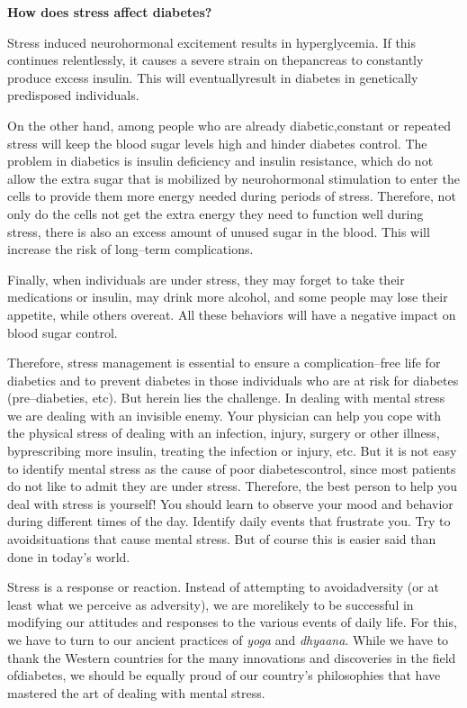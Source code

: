 \noindent\textbf{How does stress affect diabetes?}

Stress induced neurohormonal excitement results in hypergly\-ce\-mia. If this continues relentlessly, it causes a severe strain on the\break pancreas to constantly produce excess insulin. This will eventually\break result in diabetes in genetically predisposed individuals.

On the other hand, among people who are already diabetic,\break constant or repeated stress will keep the blood sugar levels high and hinder diabetes control. The problem in diabetics is insulin deficiency and insulin resistance, which do not allow the extra sugar that is mobilized by neurohormonal stimulation to enter the cells to provide them more energy needed during periods of stress. Therefore, not only do the cells not get the extra energy they need to function well during stress, there is also an excess amount of unused sugar in the blood. This will increase the risk of long–term complications.

Finally, when individuals are under stress, they may forget to take their medications or insulin, may drink more alcohol, and some people may lose their appetite, while others overeat. All these behaviors will have a negative impact on blood sugar control.

Therefore, stress management is essential to ensure a complica\-tion–free life for diabetics and to prevent diabetes in those indivi\-duals who are at risk for diabetes (pre–diabeties, etc). But herein lies the challenge. In dealing with mental stress we are dealing with an invisible enemy. Your physician can help you cope with the physical stress of dealing with an infection, injury, surgery or other illness, by\break prescribing more insulin, treating the infection or injury, etc. But it is not easy to identify mental stress as the cause of poor diabetes\break control, since most patients do not like to admit they are under stress. Therefore, the best person to help you deal with stress is yourself! You should learn to observe your mood and behavior during different times of the day. Identify daily events that frustrate you. Try to avoid\break situations that cause mental stress. But of course this is easier said than done in today’s world.

Stress is a response or reaction. Instead of attempting to avoid\break adversity (or at least what we perceive as adversity), we are more\break likely to be successful in modifying our attitudes and responses to the various events of daily life. For this, we have to turn to our ancient practices of \textit{yoga} and \textit{dhyaana}. While we have to thank the Western countries for the many innovations and discoveries in the field of\break diabetes, we should be equally proud of our country’s philosophies that have mastered the art of dealing with mental stress.

